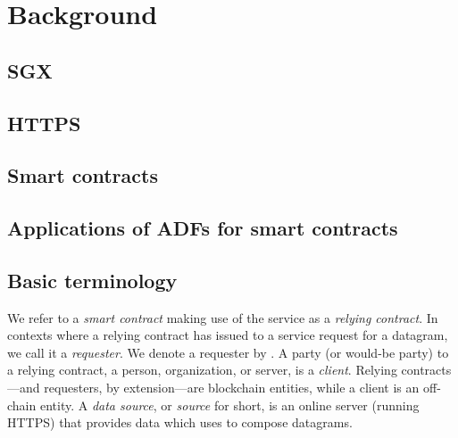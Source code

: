 \section{Background}
\subsection{SGX}
\subsection{HTTPS}
\subsection{Smart contracts}
\subsection{Applications of ADFs for smart contracts}
\subsection{Basic terminology}
We refer to a {\em smart contract} making use of the \tcs service as a \emph{relying contract}. In contexts where a relying contract has issued to \tc a service request for a datagram, we call it a \emph{requester}. We denote a requester by \reqcont. A party (or would-be party) to a relying contract, a person, organization, or server, is a \emph{client}. Relying contracts---and requesters, by extension---are blockchain entities, while a client is an off-chain entity. A \emph{data source}, or \emph{source} for short, is an online server (running HTTPS) that provides data which \tc uses to compose datagrams.

